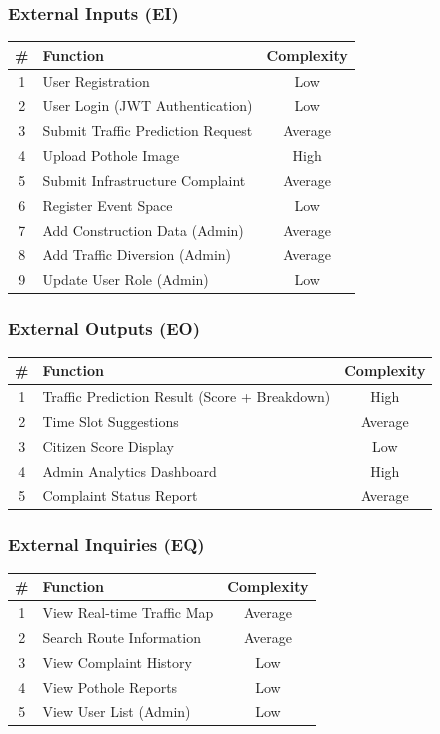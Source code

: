 \documentclass[12pt,a4paper]{article}
\begin{document}
\subsubsection*{External Inputs (EI)}
\begin{center}
\begin{tabular}{clc}
\toprule
\textbf{\#} & \textbf{Function} & \textbf{Complexity} \\
\midrule
1 & User Registration & Low \\
2 & User Login (JWT Authentication) & Low \\
3 & Submit Traffic Prediction Request & Average \\
4 & Upload Pothole Image & High \\
5 & Submit Infrastructure Complaint & Average \\
6 & Register Event Space & Low \\
7 & Add Construction Data (Admin) & Average \\
8 & Add Traffic Diversion (Admin) & Average \\
9 & Update User Role (Admin) & Low \\
\bottomrule
\end{tabular}
\end{center}

\subsubsection*{External Outputs (EO)}
\begin{center}
\begin{tabular}{clc}
\toprule
\textbf{\#} & \textbf{Function} & \textbf{Complexity} \\
\midrule
1 & Traffic Prediction Result (Score + Breakdown) & High \\
2 & Time Slot Suggestions & Average \\
3 & Citizen Score Display & Low \\
4 & Admin Analytics Dashboard & High \\
5 & Complaint Status Report & Average \\
\bottomrule
\end{tabular}
\end{center}

\subsubsection*{External Inquiries (EQ)}
\begin{center}
\begin{tabular}{clc}
\toprule
\textbf{\#} & \textbf{Function} & \textbf{Complexity} \\
\midrule
1 & View Real-time Traffic Map & Average \\
2 & Search Route Information & Average \\
3 & View Complaint History & Low \\
4 & View Pothole Reports & Low \\
5 & View User List (Admin) & Low \\
\bottomrule
\end{tabular}
\end{center}
\end{document}
